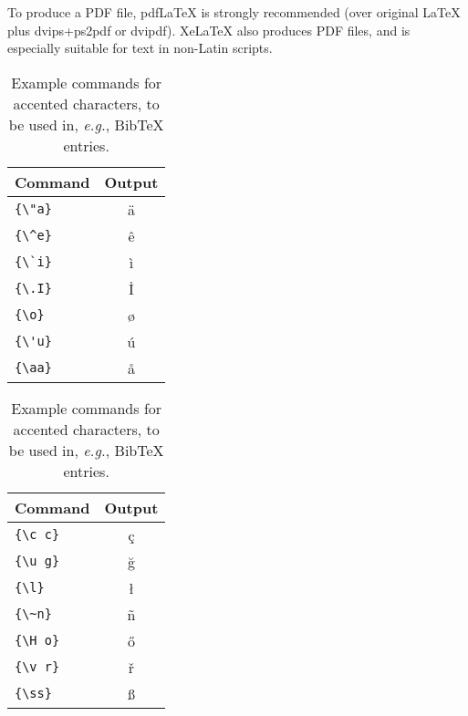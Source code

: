 \documentclass[11pt]{article}
\begin{document}
To produce a PDF file, pdf\LaTeX{} is strongly recommended (over original \LaTeX{} plus dvips+ps2pdf or dvipdf). Xe\LaTeX{} also produces PDF files, and is especially suitable for text in non-Latin scripts.
\begin{table}
	\centering
	\begin{tabular}{lc}
		\hline
		\textbf{Command} & \textbf{Output} \\
		\hline
		\verb|{\"a}|     & {\"a}           \\
		\verb|{\^e}|     & {\^e}           \\
		\verb|{\`i}|     & {\`i}           \\
		\verb|{\.I}|     & {\.I}           \\
		\verb|{\o}|      & {\o}            \\
		\verb|{\'u}|     & {\'u}           \\
		\verb|{\aa}|     & {\aa}           \\\hline
	\end{tabular}
	\begin{tabular}{lc}
		\hline
		\textbf{Command} & \textbf{Output} \\
		\hline
		\verb|{\c c}|    & {\c c}          \\
		\verb|{\u g}|    & {\u g}          \\
		\verb|{\l}|      & {\l}            \\
		\verb|{\~n}|     & {\~n}           \\
		\verb|{\H o}|    & {\H o}          \\
		\verb|{\v r}|    & {\v r}          \\
		\verb|{\ss}|     & {\ss}           \\
		\hline
	\end{tabular}
	\caption{Example commands for accented characters, to be used in, \emph{e.g.}, Bib\TeX{} entries.}
	\label{tab:accents}
\end{table}
\end{document}
